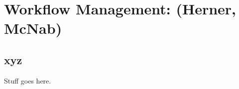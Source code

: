 \chapter{Workflow Management: (Herner, McNab)}
\label{ch:workflow}

\section{xyz}
\label{sec:workflow:xyz}  %
Stuff goes here.
